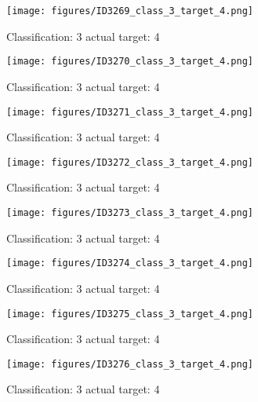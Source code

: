 \begin{figure}[h!]
\begin{center}
\texttt{[image: figures/ID3269\_class\_3\_target\_4.png]}
\end{center}
\caption{ Classification: 3 actual target: 4}
\label{fig:ID3269_class_3_target_4}
\end{figure}
\begin{figure}[h!]
\begin{center}
\texttt{[image: figures/ID3270\_class\_3\_target\_4.png]}
\end{center}
\caption{ Classification: 3 actual target: 4}
\label{fig:ID3270_class_3_target_4}
\end{figure}
\begin{figure}[h!]
\begin{center}
\texttt{[image: figures/ID3271\_class\_3\_target\_4.png]}
\end{center}
\caption{ Classification: 3 actual target: 4}
\label{fig:ID3271_class_3_target_4}
\end{figure}
\begin{figure}[h!]
\begin{center}
\texttt{[image: figures/ID3272\_class\_3\_target\_4.png]}
\end{center}
\caption{ Classification: 3 actual target: 4}
\label{fig:ID3272_class_3_target_4}
\end{figure}
\begin{figure}[h!]
\begin{center}
\texttt{[image: figures/ID3273\_class\_3\_target\_4.png]}
\end{center}
\caption{ Classification: 3 actual target: 4}
\label{fig:ID3273_class_3_target_4}
\end{figure}
\begin{figure}[h!]
\begin{center}
\texttt{[image: figures/ID3274\_class\_3\_target\_4.png]}
\end{center}
\caption{ Classification: 3 actual target: 4}
\label{fig:ID3274_class_3_target_4}
\end{figure}
\begin{figure}[h!]
\begin{center}
\texttt{[image: figures/ID3275\_class\_3\_target\_4.png]}
\end{center}
\caption{ Classification: 3 actual target: 4}
\label{fig:ID3275_class_3_target_4}
\end{figure}
\begin{figure}[h!]
\begin{center}
\texttt{[image: figures/ID3276\_class\_3\_target\_4.png]}
\end{center}
\caption{ Classification: 3 actual target: 4}
\label{fig:ID3276_class_3_target_4}
\end{figure}
